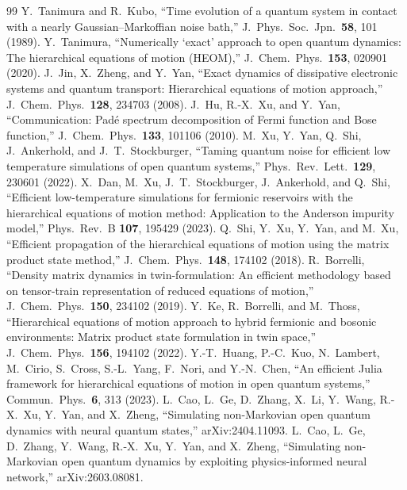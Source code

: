 \documentclass[11pt,a4paper]{article}
\begin{document}
\begin{thebibliography}{99}
\small
{} Y.~Tanimura and R.~Kubo, ``Time evolution of a quantum system in contact with a nearly Gaussian--Markoffian noise bath,'' J.\ Phys.\ Soc.\ Jpn.\ \textbf{58}, 101 (1989).
 Y.~Tanimura, ``Numerically `exact' approach to open quantum dynamics: The hierarchical equations of motion (HEOM),'' J.\ Chem.\ Phys.\ \textbf{153}, 020901 (2020).
 J.~Jin, X.~Zheng, and Y.~Yan, ``Exact dynamics of dissipative electronic systems and quantum transport: Hierarchical equations of motion approach,'' J.\ Chem.\ Phys.\ \textbf{128}, 234703 (2008).
 J.~Hu, R.-X.~Xu, and Y.~Yan, ``Communication: Pad\'e spectrum decomposition of Fermi function and Bose function,'' J.\ Chem.\ Phys.\ \textbf{133}, 101106 (2010).
 M.~Xu, Y.~Yan, Q.~Shi, J.~Ankerhold, and J.~T.~Stockburger, ``Taming quantum noise for efficient low temperature simulations of open quantum systems,'' Phys.\ Rev.\ Lett.\ \textbf{129}, 230601 (2022).
 X.~Dan, M.~Xu, J.~T.~Stockburger, J.~Ankerhold, and Q.~Shi, ``Efficient low-temperature simulations for fermionic reservoirs with the hierarchical equations of motion method: Application to the Anderson impurity model,'' Phys.\ Rev.\ B \textbf{107}, 195429 (2023).
 Q.~Shi, Y.~Xu, Y.~Yan, and M.~Xu, ``Efficient propagation of the hierarchical equations of motion using the matrix product state method,'' J.\ Chem.\ Phys.\ \textbf{148}, 174102 (2018).
 R.~Borrelli, ``Density matrix dynamics in twin-formulation: An efficient methodology based on tensor-train representation of reduced equations of motion,'' J.\ Chem.\ Phys.\ \textbf{150}, 234102 (2019).
 Y.~Ke, R.~Borrelli, and M.~Thoss, ``Hierarchical equations of motion approach to hybrid fermionic and bosonic environments: Matrix product state formulation in twin space,'' J.\ Chem.\ Phys.\ \textbf{156}, 194102 (2022).
 Y.-T.~Huang, P.-C.~Kuo, N.~Lambert, M.~Cirio, S.~Cross, S.-L.~Yang, F.~Nori, and Y.-N.~Chen, ``An efficient Julia framework for hierarchical equations of motion in open quantum systems,'' Commun.\ Phys.\ \textbf{6}, 313 (2023).
 L.~Cao, L.~Ge, D.~Zhang, X.~Li, Y.~Wang, R.-X.~Xu, Y.~Yan, and X.~Zheng, ``Simulating non-Markovian open quantum dynamics with neural quantum states,'' arXiv:2404.11093.
 L.~Cao, L.~Ge, D.~Zhang, Y.~Wang, R.-X.~Xu, Y.~Yan, and X.~Zheng, ``Simulating non-Markovian open quantum dynamics by exploiting physics-informed neural network,'' arXiv:2603.08081.

\end{thebibliography}
\end{document}
